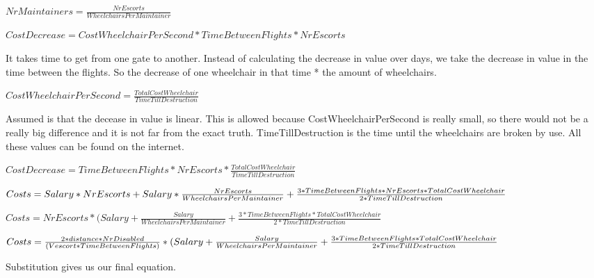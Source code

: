 \documentclass[a4paper, 11pt, notitlepage]{report}
\begin{document}
\begin{description}
	\item $NrMaintainers = \frac{NrEscorts}{WheelchairsPerMaintainer}$
	\item
	\item $CostDecrease  = CostWheelchairPerSecond * TimeBetweenFlights * NrEscorts$
	\item[Explanation:] It takes time to get from one gate to another. Instead of calculating the decrease in value over days, we take the decrease in value in the time between the flights. So the decrease of one wheelchair in that time * the amount of wheelchairs.
	\item $CostWheelchairPerSecond = \frac{TotalCostWheelchair}{TimeTillDestruction}$
	\item[Explanation:] Assumed is that the decease in value is linear. This is allowed because CostWheelchairPerSecond is really small, so there would not be a really big difference and it is not far from the exact truth. TimeTillDestruction is the time until the wheelchairs are broken by use. All these values can be found on the internet.
	\item $CostDecrease  = TimeBetweenFlights * NrEscorts * \frac{TotalCostWheelchair}{TimeTillDestruction}$
	\item
	\item $Costs = Salary * NrEscorts + Salary * \frac{NrEscorts}{WheelchairsPerMaintainer} \\ \\+ \frac{3* TimeBetweenFlights * NrEscorts * TotalCostWheelchair}{2*TimeTillDestruction}$
	\item $Costs = NrEscorts * (Salary + \frac{Salary}{WheelchairsPerMaintainer} + \frac{3* TimeBetweenFlights * TotalCostWheelchair}{2*TimeTillDestruction}$
	\item $Costs = \frac{2*distance*NrDisabled}{(Vescort*TimeBetweenFlights)} * \\ \\(Salary + \frac{Salary}{WheelchairsPerMaintainer} + \frac{3* TimeBetweenFlights * TotalCostWheelchair}{2*TimeTillDestruction}$
	\item[Explanation:] Substitution gives us our final equation.
	\item
\end{description}
\end{document}

